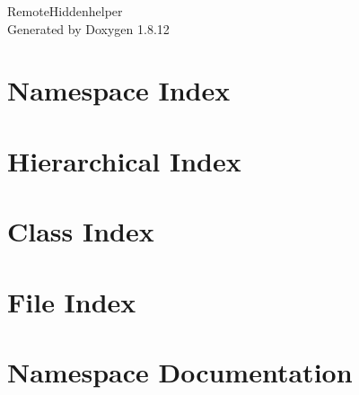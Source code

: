 \documentclass[twoside]{book}
\newcommand{\+}{\discretionary{\mbox{\scriptsize$\hookleftarrow$}}{}{}}
\newcommand{\clearemptydoublepage}{%
  \newpage{\pagestyle{empty}\cleardoublepage}%
}
\begin{document}
\hypersetup{pageanchor=false,
             bookmarksnumbered=true,
             pdfencoding=unicode
            }
\begin{titlepage}
\vspace*{7cm}
\begin{center}%
{\Large Remote\+Hiddenhelper }\\
\vspace*{1cm}
{\large Generated by Doxygen 1.8.12}\\
\end{center}
\end{titlepage}
\clearemptydoublepage
{}
\tableofcontents
\clearemptydoublepage
{}
\hypersetup{pageanchor=true}

\chapter{Namespace Index}

\chapter{Hierarchical Index}

\chapter{Class Index}

\chapter{File Index}

\chapter{Namespace Documentation}



\end{document}
